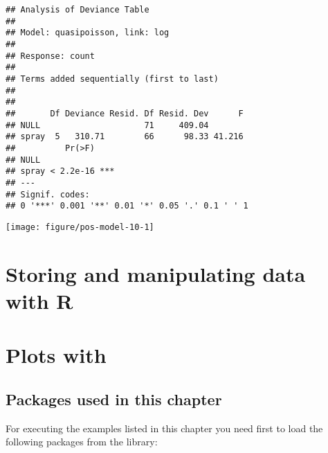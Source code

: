 \documentclass[paper=a4,headsepline,BCOR=12mm,twoside,open=right,%
titlepage,headings=small,fontsize=10pt,index=totoc,bibliography=totoc,%
captions=tableheading,captions=nooneline]{scrbook}\usepackage{knitr}
\begin{document}
\begin{knitrout}\footnotesize
{}\color{fgcolor}\begin{kframe}
\begin{alltt}
 \hlkwb{<-}  \hlopt{~}     
  \hlstd{=} \hlstd{)}
  \hlstd{=} \hlstd{)}
\end{alltt}
\begin{verbatim}
## Analysis of Deviance Table
## 
## Model: quasipoisson, link: log
## 
## Response: count
## 
## Terms added sequentially (first to last)
## 
## 
##       Df Deviance Resid. Df Resid. Dev      F
## NULL                     71     409.04       
## spray  5   310.71        66      98.33 41.216
##          Pr(>F)    
## NULL               
## spray < 2.2e-16 ***
## ---
## Signif. codes:  
## 0 '***' 0.001 '**' 0.01 '*' 0.05 '.' 0.1 ' ' 1
\end{verbatim}
\end{kframe}

{\centering \texttt{[image: figure/pos-model-10-1]} 

}



\end{knitrout}





\chapter{Storing and manipulating data with R}\label{chap:R:data}






\chapter[Plots with ggpplot]{Plots with \ggplot}\label{chap:R:plotting}

\section{Packages used in this chapter}

For executing the examples listed in this chapter you need first to load the following packages from the library:
\end{document}
